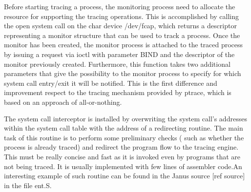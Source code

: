 Before starting tracing a process, the monitoring process need to allocate the resource for supporting the tracing operations. This is accomplished by calling the open system call on the char device /dev/fcap, which returns a descriptor representing a monitor structure that can be used to track a process. Once the monitor has been created, the monitor process is attached to the traced process by issuing a request via ioctl with parameter BIND and the descriptor of the monitor previously created. Furthermore, this function takes two additional parameters that give the possibility to the monitor process to specify for which system call entry/exit it will be notified. This is the first difference and improvement respect to the tracing mechanism provided by ptrace, which is based on an approach of all-or-nothing.  

The system call interceptor is installed by overwriting the system call's addresses within the system call table with the address of a redirecting routine. The main task of this routine is to perform some preliminary checks ( such as whether the process is already traced) and redirect the program flow to the tracing engine. 
This must be really concise and fast as it is invoked even by programs that are not being traced. It is usually implemented with few lines of assembler code.An interesting example of such routine can be found in the Janus source [ref source] in the file ent.S. 

